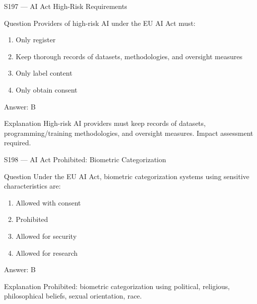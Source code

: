 \documentclass[aspectratio=169,8pt]{beamer}
\begin{document}
	\begin{frame}{S197 --- AI Act High-Risk Requirements}
		\begin{block}{Question}
			Providers of high-risk AI under the EU AI Act must:
			\begin{enumerate}
				\item Only register
				\item Keep thorough records of datasets, methodologies, and oversight measures
				\item Only label content
				\item Only obtain consent
			\end{enumerate}
		\end{block}
		\begin{exampleblock}{Answer: B}\end{exampleblock}
		\begin{block}{Explanation}
			High-risk AI providers must keep records of datasets, programming/training methodologies, and oversight measures. Impact assessment required.
		\end{block}
	\end{frame}
	
	\begin{frame}{S198 --- AI Act Prohibited: Biometric Categorization}
		\begin{block}{Question}
			Under the EU AI Act, biometric categorization systems using sensitive characteristics are:
			\begin{enumerate}
				\item Allowed with consent
				\item Prohibited
				\item Allowed for security
				\item Allowed for research
			\end{enumerate}
		\end{block}
		\begin{exampleblock}{Answer: B}\end{exampleblock}
		\begin{block}{Explanation}
			Prohibited: biometric categorization using political, religious, philosophical beliefs, sexual orientation, race.
		\end{block}
	\end{frame}
	
\end{document}
